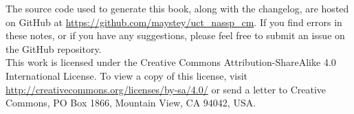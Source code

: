 The source code used to generate this book, along with the changelog, are hosted on GitHub at \url{https://github.com/maystey/uct_nassp_cm}. If you find errors in these notes, or if you have any suggestions, please feel free to submit an issue on the GitHub repository.\\

This work is licensed under the Creative Commons Attribution-ShareAlike 4.0 International License. To view a copy of this license, visit \url{http://creativecommons.org/licenses/by-sa/4.0/} or send a letter to Creative Commons, PO Box 1866, Mountain View, CA 94042, USA.







